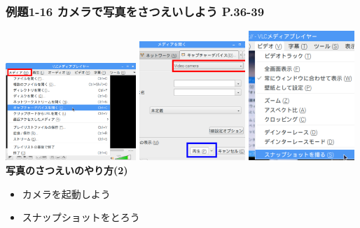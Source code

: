 \documentclass[dvipdfmx]{beamer}
\begin{document}
\begin{frame}[fragile]
	\frametitle{例題1-16 カメラで写真をさつえいしよう P.36-39~~~}
    \includegraphics[width=0.37\textwidth]{textbook-img116.png}
    \hfill
    \includegraphics[width=0.3\textwidth]{slide03_004.png}
    \hfill
    \includegraphics[width=0.3\textwidth]{slide03_005.png}
    \vfill
    \large\textbf{写真のさつえいのやり方(2)}
    \begin{itemize}
      \item カメラを起動しよう
      \item スナップショットをとろう
    \end{itemize}
\end{frame}
\end{document}
